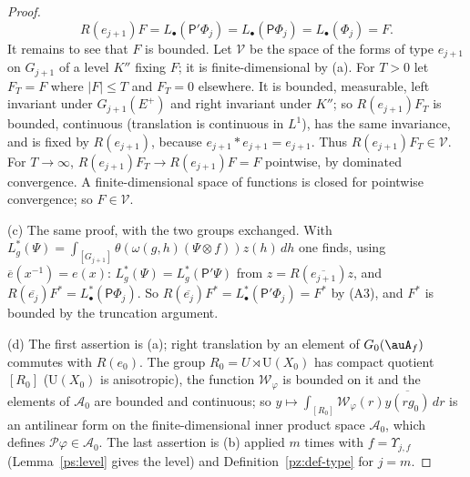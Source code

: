 \documentclass[10pt]{amsart}
\theoremstyle{definition}
\theoremstyle{remark}
\providecommand{\auAz}{\mathcal A_0}
\providecommand{\auP}{\mathcal P}
\providecommand{\auU}{\mathrm U}
\begin{document}
\begin{proof}
\[
R(e_{j+1})F=L_\bullet(\mathsf P'\Phi_j)=L_\bullet(\mathsf P\Phi_j)=L_\bullet(\Phi_j)=F .
\]
It remains to see that $F$ is bounded. Let $\mathcal V$ be the space of the forms of type
$e_{j+1}$ on $G_{j+1}$ of a level $K''$ fixing $F$; it is finite-dimensional by (a). For $T>0$ let
$F_T=F$ where $|F|\le T$ and $F_T=0$ elsewhere. It is bounded, measurable, left invariant under
$G_{j+1}(E^+)$ and right invariant under $K''$; so $R(e_{j+1})F_T$ is bounded, continuous
(translation is continuous in $L^1$), has the same invariance, and is fixed by $R(e_{j+1})$,
because $e_{j+1}*e_{j+1}=e_{j+1}$. Thus $R(e_{j+1})F_T\in\mathcal V$. For $T\to\infty$,
$R(e_{j+1})F_T\to R(e_{j+1})F=F$ pointwise, by dominated convergence. A finite-dimensional space of
functions is closed for pointwise convergence; so $F\in\mathcal V$.

(c) The same proof, with the two groups exchanged. With $L^*_g(\Psi)=\int_{[G_{j+1}]}\theta(\omega
(g,h)(\Psi\otimes f))z(h)\,dh$ one finds, using $\overline{e}(x^{-1})=e(x)$: $L^*_g(\Psi)=L^*_g(
\mathsf P'\Psi)$ from $z=R(\overline{e_{j+1}})z$, and $R(\overline{e_j})F^*=L^*_\bullet(\mathsf P
\Phi_j)$. So $R(\overline{e_j})F^*=L^*_\bullet(\mathsf P'\Phi_j)=F^*$ by (A3), and $F^*$ is bounded by
the truncation argument.

(d) The first assertion is (a); right translation by an element of $G_0(\auA_f)$ commutes with
$R(e_0)$. The group $R_0=U\rtimes\auU(X_0)$ has compact quotient $[R_0]$ ($\auU(X_0)$ is
anisotropic), the function $\mathcal W_\varphi$ is bounded on it and the elements of $\auAz$ are
bounded and continuous; so $y\mapsto\int_{[R_0]}\mathcal W_\varphi(r)\overline{y(rg_0)}\,dr$ is an
antilinear form on the finite-dimensional inner product space $\auAz$, which defines $\auP\varphi
\in\auAz$. The last assertion is (b) applied $m$ times with $f=\Upsilon_{j,f}$
(Lemma~\ref{ps:level} gives the level) and Definition~\ref{pz:def-type} for $j=m$.
\end{proof}
\end{document}
